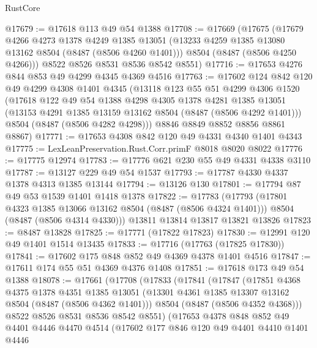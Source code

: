 \begin{lexlean}{RustCore}
\begin{coremodule}
@17679 := @17618 @113 @49 @54 @1388
@17708 := @17669
    (@17675
      (@17679
        @4266
        @4273
        @1378
        @4249
        @1385
        @13051
        (@13233 @4259 @1385 @13080 @13162 @8504 (@8487 (@8506 @4260 @1401)))
        @8504
        (@8487 (@8506 @4250 @4266)))
      @8522
      @8526
      @8531
      @8536
      @8542
      @8551)
@17716 := @17653 @4276 @844 @853 @49 @4299 @4345 @4369 @4516
@17763 := @17602
    @124
    @842
    @120
    @49
    @4299
    @4308
    @1401
    @4345
    (@13118
      @123
      @55
      @51
      @4299
      @4306
      @1520
      (@17618
        @122
        @49
        @54
        @1388
        @4298
        @4305
        @1378
        @4281
        @1385
        @13051
        (@13153 @4291 @1385 @13159 @13162 @8504 (@8487 (@8506 @4292 @1401)))
        @8504
        (@8487 (@8506 @4282 @4298)))
      @8846
      @8849
      @8852
      @8856
      @8861
      @8867)
@17771 := @17653 @4308 @842 @120 @49 @4331 @4340 @1401 @4343
@17775 := LexLeanPreservation.Rust.Corr.primF @8018 @8020 @8022
@17776 := @17775 @12974
@17783 := @17776 @621 @230 @55 @49 @4331 @4338 @3110
@17787 := @13127 @229 @49 @54 @1537
@17793 := @17787 @4330 @4337 @1378 @4313 @1385 @13144
@17794 := @13126 @130
@17801 := @17794 @87 @49 @53 @1539 @1401 @1418 @1378
@17822 := @17783
    (@17793
      (@17801 @4323 @1385 @13066 @13162 @8504 (@8487 (@8506 @4324 @1401)))
      @8504
      (@8487 (@8506 @4314 @4330)))
    @13811
    @13814
    @13817
    @13821
    @13826
@17823 := @8487 @13828
@17825 := @17771 (@17822 @17823)
@17830 := @12991 @120 @49 @1401 @1514 @13435
@17833 := @17716 (@17763 (@17825 @17830))
@17841 := @17602 @175 @848 @852 @49 @4369 @4378 @1401 @4516
@17847 := @17611 @174 @55 @51 @4369 @4376 @1408
@17851 := @17618 @173 @49 @54 @1388
@18078 := @17661
    (@17708
      (@17833
        (@17841
          (@17847
            (@17851
              @4368
              @4375
              @1378
              @4351
              @1385
              @13051
              (@13301 @4361 @1385 @13307 @13162 @8504 (@8487 (@8506 @4362 @1401)))
              @8504
              (@8487 (@8506 @4352 @4368)))
            @8522
            @8526
            @8531
            @8536
            @8542
            @8551)
          (@17653
            @4378
            @848
            @852
            @49
            @4401
            @4446
            @4470
            @4514
            (@17602
              @177
              @846
              @120
              @49
              @4401
              @4410
              @1401
              @4446

\end{coremodule}
\end{lexlean}
